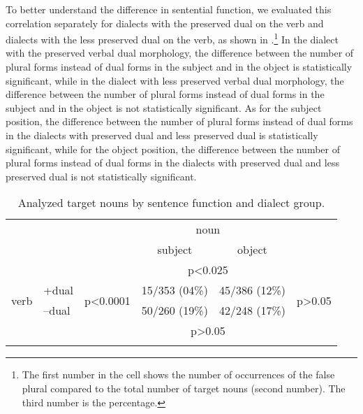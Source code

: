 \documentclass[output=paper,colorlinks,citecolor=brown]{langscibook}
\begin{document}
\noindent To better understand the difference in sentential function, we evaluated this correlation separately for dialects with the preserved dual on the verb and dialects with the less preserved dual on the verb, as shown in .\footnote{The
     first number in the cell shows the number of occurrences of the false plural compared to the total number of target nouns (second number). The third number is the percentage.
} In the dialect with the preserved verbal dual morphology, the difference between the number of plural forms instead of dual forms in the subject and in the object is statistically significant, while in the dialect with less preserved verbal dual morphology, the difference between the number of plural forms instead of dual forms in the subject and in the object is not statistically significant. As for the subject position, the difference between the number of plural forms instead of dual forms in the dialects with preserved dual and less preserved dual is statistically significant, while for the object position, the difference between the number of plural forms instead of dual forms in the dialects with preserved dual and less preserved dual is not statistically significant.\clearpage

\begin{table}
    \begin{tabular}{llcccc}
    \lsptoprule
                    && \multicolumn{4}{c}{noun}\\
                    &&&subject & object&\\
                    \midrule
                    && \multicolumn{4}{c}{{p<0.025}}\\
\multirow{2}{3em}{verb}&+dual& \multirow{2}{4em}{{p<0.0001}}  & 15/353 (04\%)  & 45/386 (12\%) & \multirow{2}{4em}{{p>0.05}}  \\
&--dual              &                              & 50/260 (19\%) & 42/248 (17\%) &                            \\	
                    && \multicolumn{4}{c}{{p>0.05}}\\
    \lspbottomrule
    \end{tabular}
    \caption{Analyzed target nouns by sentence function and dialect group.}
    \label{tab:pav:05}
\end{table}
\end{document}
